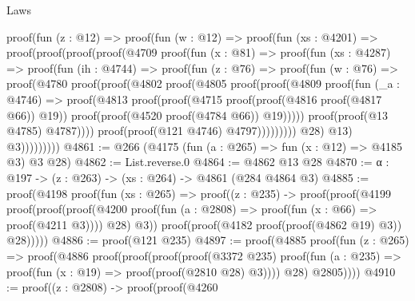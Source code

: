 \begin{lexlean}{Laws}
\begin{coremodule}
            proof(fun (z : @12) =>
              proof(fun (w : @12) =>
                proof(fun (xs : @4201) =>
                  proof(proof(proof(proof(@4709
                            proof(fun (x : @81) =>
                              proof(fun (xs : @4287) =>
                                proof(fun (ih : @4744) =>
                                  proof(fun (z : @76) =>
                                    proof(fun (w : @76) =>
                                      proof(@4780
                                          proof(proof(@4802
                                                proof(@4805
                                                    proof(proof(@4809
                                                          proof(fun (_a : @4746) =>
                                                            proof(@4813
                                                                proof(proof(@4715
                                                                      proof(proof(@4816
                                                                            proof(@4817 @66))
                                                                          @19))
                                                                    proof(proof(@4520
                                                                          proof(@4784 @66))
                                                                        @19)))))
                                                        proof(proof(@13 @4785) @4787))))
                                              proof(proof(@121 @4746) @4797)))))))))
                          @28)
                        @13)
                      @3)))))))))
@4861 := @266 (@4175 (fun (a : @265) => fun (x : @12) => @4185 @3) @3 @28)
@4862 := List.reverse.{0}
@4864 := @4862 @13 @28
@4870 := {α : @197} -> (z : @263) -> (xs : @264) -> @4861 (@284 @4864 @3)
@4885 := proof(@4198
      proof(fun (xs : @265) =>
        proof((z : @235) ->
          proof(proof(@4199
                proof(proof(proof(@4200
                        proof(fun (a : @2808) => proof(fun (x : @66) => proof(@4211 @3))))
                      @28)
                    @3))
              proof(proof(@4182 proof(proof(@4862 @19) @3)) @28)))))
@4886 := proof(@121 @235)
@4897 := proof(@4885
      proof(fun (z : @265) =>
        proof(@4886
            proof(proof(proof(proof(@3372 @235)
                    proof(fun (a : @235) => proof(fun (x : @19) => proof(proof(@2810 @28) @3))))
                  @28)
                @2805))))
@4910 := proof((z : @2808) ->
    proof(proof(@4260

\end{coremodule}
\end{lexlean}
